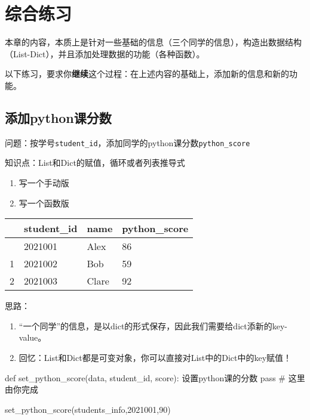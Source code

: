 \documentclass[
  letterpaper,
  DIV=11,
  numbers=noendperiod]{scrreprt}
\newenvironment{Shaded}{\begin{snugshade}}{\end{snugshade}}
\newcommand{\CommentTok}[1]{\textcolor[rgb]{0.37,0.37,0.37}{#1}}
\newcommand{\ControlFlowTok}[1]{\textcolor[rgb]{0.00,0.23,0.31}{#1}}
\newcommand{\DecValTok}[1]{\textcolor[rgb]{0.68,0.00,0.00}{#1}}
\newcommand{\KeywordTok}[1]{\textcolor[rgb]{0.00,0.23,0.31}{#1}}
\newcommand{\NormalTok}[1]{\textcolor[rgb]{0.00,0.23,0.31}{#1}}
\providecommand{\tightlist}{%
  \setlength{\itemsep}{0pt}\setlength{\parskip}{0pt}}\usepackage{longtable,booktabs,array}
\begin{document}
\hypertarget{ux7efcux5408ux7ec3ux4e60}{%
\section{综合练习}\label{ux7efcux5408ux7ec3ux4e60}}

本章的内容，本质上是针对一些基础的信息（三个同学的信息），构造出数据结构（List-Dict），并且添加处理数据的功能（各种函数）。

以下练习，要求你\textbf{继续}这个过程：在上述内容的基础上，添加新的信息和新的功能。

\hypertarget{ux6dfbux52a0pythonux8bfeux5206ux6570}{%
\subsection{添加python课分数}\label{ux6dfbux52a0pythonux8bfeux5206ux6570}}

问题：按学号\texttt{student\_id}，添加同学的python课分数\texttt{python\_score}

知识点：List和Dict的赋值，循环或者列表推导式

\begin{enumerate}
\def\labelenumi{\arabic{enumi}.}
\tightlist
\item
  写一个手动版
\item
  写一个函数版
\end{enumerate}

\begin{longtable}[]{@{}llll@{}}
\toprule\noalign{}
& student\_id & name & python\_score \\
\midrule\noalign{}
\endhead
\bottomrule\noalign{}
\endlastfoot
0 & 2021001 & Alex & 86 \\
1 & 2021002 & Bob & 59 \\
2 & 2021003 & Clare & 92 \\
\end{longtable}

思路：

\begin{enumerate}
\def\labelenumi{\arabic{enumi}.}
\tightlist
\item
  ``一个同学''的信息，是以dict的形式保存，因此我们需要给dict添新的key-value。
\item
  回忆：List和Dict都是可变对象，你可以直接对List中的Dict中的key赋值！
\end{enumerate}

\begin{Shaded}
\begin{Highlighting}[]
\KeywordTok{def}\NormalTok{ set\_python\_score(data, student\_id, score):}
  \CommentTok{\textquotesingle{}\textquotesingle{}\textquotesingle{}}
\CommentTok{  设置python课的分数}
\CommentTok{  \textquotesingle{}\textquotesingle{}\textquotesingle{}}
  \ControlFlowTok{pass} \CommentTok{\# 这里由你完成}

\NormalTok{set\_python\_score(students\_info,}\DecValTok{2021001}\NormalTok{,}\DecValTok{90}\NormalTok{)}
\end{Highlighting}
\end{Shaded}
\end{document}
